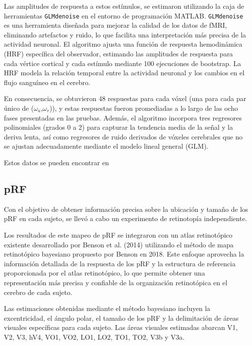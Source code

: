 Las amplitudes de respuesta a estos estímulos, se estimaron utilizando la caja de herramientas \texttt{GLMdenoise}  en el entorno de programación MATLAB. \texttt{GLMdenoise} es una herramienta diseñada para mejorar la calidad de los datos de fMRI, eliminando artefactos y ruido, lo que facilita una interpretación más precisa de la actividad neuronal. El algoritmo ajusta una función de respuesta hemodinámica (HRF) específica del observador, estimando las amplitudes de respuesta para cada v\'ertice cortical y cada estímulo mediante 100 ejecuciones de bootstrap. La HRF modela la relación temporal entre la actividad neuronal y los cambios en el flujo sanguíneo en el cerebro.

En consecuencia, se obtuvieron 48 respuestas para cada vóxel (una para cada par único de ($\omega_a$,$\omega_r$)), y estas respuestas fueron promediadas a lo largo de las ocho fases presentadas en las pruebas. Además, el algoritmo incorpora tres regresores polinomiales (grados 0 a 2) para capturar la tendencia media de la señal y la deriva lenta, así como regresores de ruido derivados de vóxeles cerebrales que no se ajustan adecuadamente mediante el modelo lineal general (GLM). 

Estos datos se pueden encontrar en 

\subsection{pRF}

Con el objetivo de obtener información precisa sobre la ubicación y tamaño de los pRF en cada sujeto, se llevó a cabo un experimento de retinotopía independiente. 

Los resultados de este mapeo de pRF se integraron con un atlas retinotópico existente desarrollado por Benson et al. (2014) utilizando el método de mapa retinotópico bayesiano propuesto por Benson en 2018. Este enfoque aprovecha la información detallada de la respuesta de los pRF y la estructura de referencia proporcionada por el atlas retinotópico, lo que permite obtener una representación más precisa y confiable de la organización retinotópica en el cerebro de cada sujeto.

Las estimaciones obtenidas mediante el método bayesiano incluyen la excentricidad, el ángulo polar, el tamaño de los pRF y la delimitación de áreas visuales específicas para cada sujeto. Las áreas visuales estimadas abarcan V1, V2, V3, hV4, VO1, VO2, LO1, LO2, TO1, TO2, V3b y V3a.

